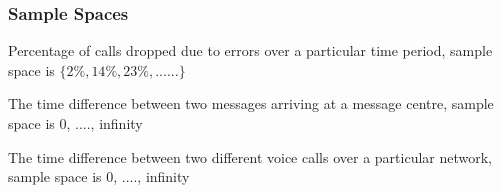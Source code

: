 \documentclass[IntroMain.tex]{subfiles}
\begin{document}
\begin{frame}
	\frametitle{Sample Spaces}
	
	Percentage of calls dropped due to errors over a particular time period, sample space is $\{2\%, 14\%, 23\%, ......\}$
		
		The time difference between two messages arriving at a message centre, sample space is {0, ...., infinity}
		
		The time difference between two different voice calls over a particular network, sample space is {0, ...., infinity}
		
	\end{frame}

\end{document}
